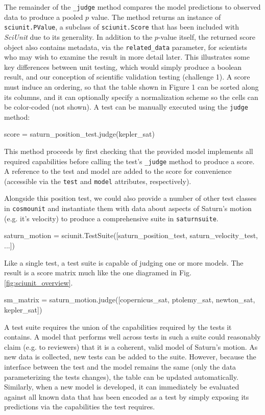 \documentclass[9pt]{sig-alternate}
\newcommand{\verbx}[1]{\lstinline{#1}}
\begin{document}
The remainder of the \verbx{_judge} method compares the model predictions to observed data to produce a pooled $p$ value. The method returns an instance of \verbx{sciunit.PValue}, a subclass of \texttt{sciunit.Score} that has been included with \textit{SciUnit} due to its generality. In addition to the $p$-value itself, the returned score object also contains metadata, via the \verbx{related_data} parameter, for  scientists who may wish to examine the result in more detail later. This illustrates some key differences between unit testing, which would simply produce a boolean result, and our conception of scientific validation testing (challenge 1). A score must induce an ordering, so that the table shown in Figure 1 can be sorted along its columns, and it can optionally specify a normalization scheme so the cells can be color-coded (not shown). A test can be manually executed using the \verbx{judge} method:
\begin{python}
score = saturn_position_test.judge(kepler_sat)
\end{python}

This method proceeds by first checking that the provided model implements all required capabilities before calling the test's \verbx{_judge} method to produce a score. A reference to the test and model are added to the score for convenience (accessible via the \verbx{test} and \verbx{model} attributes, respectively).

Alongside this position test, we could also provide a number of other test classes in \verbx{cosmounit} and instantiate them with data about aspects of Saturn's motion (e.g. it's velocity)  to produce a comprehensive suite in \verbx{saturnsuite}. 
\begin{python}
saturn_motion = sciunit.TestSuite([saturn_position_test, saturn_velocity_test, ...])
\end{python}
Like a single test, a test suite is capable of judging one or more models. The result is a score matrix much like the one diagramed in Fig. \ref{fig:sciunit_overview}.
\begin{python}
sm_matrix = saturn_motion.judge([copernicus_sat, ptolemy_sat, newton_sat, kepler_sat])
\end{python}
A test suite requires the union of the capabilities required by the tests it contains. A model that performs well across tests in such a suite could reasonably claim (e.g. to reviewers) that it is a coherent, valid model of Saturn's motion. As new data is collected, new tests can be added to the suite. However, because the interface between the test and the model remains the same (only the data parameterizing the tests changes), the table can be updated automatically. Similarly, when a new model is developed, it can immediately be evaluated against all known data that has been encoded as a test by simply exposing its predictions via the capabilities the test requires. %
 
\end{document}
